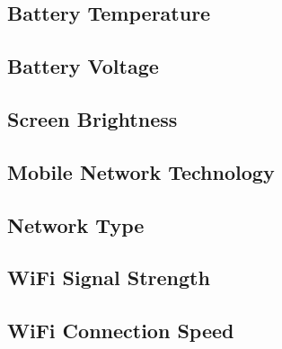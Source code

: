 \subsection{Battery Temperature}  

\subsection{Battery Voltage}  

\subsection{Screen Brightness}  

\subsection{Mobile Network Technology}  

\subsection{Network Type}  

\subsection{WiFi Signal Strength}

\subsection{WiFi Connection Speed}  